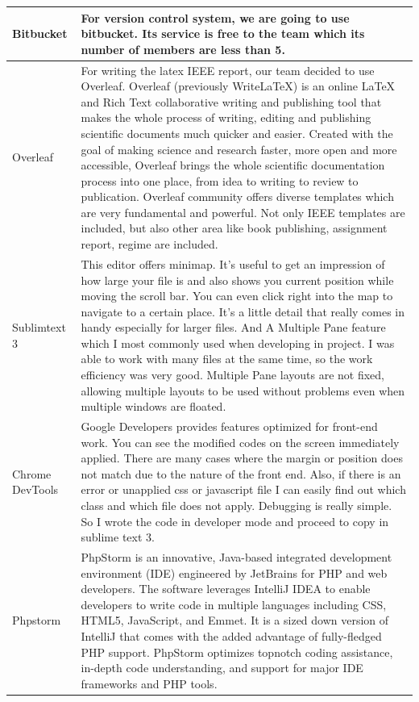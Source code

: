 \documentclass[letterpaper, 10 pt, conference]{ieeeconf}  %
\begin{document}
\begin{supertabular}{ |p{2cm}|p{5cm}|  }
 Bitbucket & For version control system, we are going to use bitbucket. Its service is free to the team which its number of members are less than 5.\\
 \hline
 Overleaf & For writing the latex IEEE report, our team decided to use Overleaf.  Overleaf (previously WriteLaTeX) is an online LaTeX and Rich Text collaborative writing and publishing tool that makes the whole process of writing, editing and publishing scientific documents much quicker and easier.
Created with the goal of making science and research faster, more open and more accessible, Overleaf brings the whole scientific documentation process into one place, from idea to writing to review to publication.
Overleaf community offers diverse templates which are very fundamental and powerful. Not only IEEE templates are included, but also other area like book publishing, assignment report, regime are included.  \\
\hline
Sublimtext 3 & This editor offers minimap. It’s useful to get an impression of how large your file is and also shows you current position while moving the scroll bar. You can even click right into the map to navigate to a certain place. It’s a little detail that really comes in handy especially for larger files.  And A Multiple Pane feature which I most commonly used when developing in project. I was able to work with many files at the same time, so the work efficiency was very good. Multiple Pane layouts are not fixed, allowing multiple layouts to be used without problems even when multiple windows are floated.\\
\hline
Chrome DevTools &Google Developers provides features optimized for front-end work. You can see the modified codes on the screen immediately applied. There are many cases where the margin or position does not match due to the nature of the front end. Also, if there is an error or unapplied css or javascript file I can easily find out which class and which file does not apply. Debugging is really simple. So I wrote the code in developer mode and proceed to copy in sublime text 3.\\
\hline
Phpstorm & PhpStorm is an innovative, Java-based integrated development environment (IDE) engineered by JetBrains for PHP and web developers. The software leverages IntelliJ IDEA to enable developers to write code in multiple languages including CSS, HTML5, JavaScript, and Emmet. It is a sized down version of IntelliJ that comes with the added advantage of fully-fledged PHP support. PhpStorm optimizes topnotch coding assistance, in-depth code understanding, and support for major IDE frameworks and PHP tools.\\

\end{supertabular}
\end{document}
